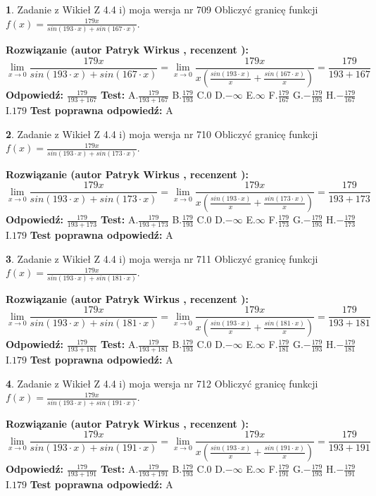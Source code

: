 \documentclass[12pt, a4paper]{article}
\theoremstyle{definition} %
\newtheorem{zad}{}
\newcommand{\zadStart}[1]{\begin{zad}#1\newline}
\newcommand{\zadStop}{\end{zad}}
\newcommand{\rozwStart}[2]{\noindent \textbf{Rozwiązanie (autor #1 , recenzent #2): }\newline}
\newcommand{\rozwStop}{\newline}
\newcommand{\odpStart}{\noindent \textbf{Odpowiedź:}\newline}
\newcommand{\odpStop}{\newline}
\newcommand{\testStart}{\noindent \textbf{Test:}\newline}
\newcommand{\testStop}{\newline}
\newcommand{\kluczStart}{\noindent \textbf{Test poprawna odpowiedź:}\newline}
\newcommand{\kluczStop}{\newline}
\begin{document}
\zadStart{Zadanie z Wikieł Z 4.4 i) moja wersja nr 709}
Obliczyć granicę funkcji $f(x)=\frac{179x}{sin(193\cdot x) +sin(167\cdot x)}$.
\zadStop
\rozwStart{Patryk Wirkus}{}
$$\lim\limits_{x\to 0}\frac{179x}{sin(193\cdot x) +sin(167\cdot x)}=\lim\limits_{x\to 0}\frac{179x}{x(\frac{sin(193\cdot x)}{x}+\frac{sin(167\cdot x)}{x})}=\frac{179}{193+167}$$
\rozwStop
\odpStart
$\frac{179}{193+167}$
\odpStop
\testStart
A.$\frac{179}{193+167}$
B.$\frac{179}{193}$
C.$0$
D.$-\infty$
E.$\infty$
F.$\frac{179}{167}$
G.$-\frac{179}{193}$
H.$-\frac{179}{167}$
I.$179$
\testStop
\kluczStart
A
\kluczStop



\zadStart{Zadanie z Wikieł Z 4.4 i) moja wersja nr 710}
Obliczyć granicę funkcji $f(x)=\frac{179x}{sin(193\cdot x) +sin(173\cdot x)}$.
\zadStop
\rozwStart{Patryk Wirkus}{}
$$\lim\limits_{x\to 0}\frac{179x}{sin(193\cdot x) +sin(173\cdot x)}=\lim\limits_{x\to 0}\frac{179x}{x(\frac{sin(193\cdot x)}{x}+\frac{sin(173\cdot x)}{x})}=\frac{179}{193+173}$$
\rozwStop
\odpStart
$\frac{179}{193+173}$
\odpStop
\testStart
A.$\frac{179}{193+173}$
B.$\frac{179}{193}$
C.$0$
D.$-\infty$
E.$\infty$
F.$\frac{179}{173}$
G.$-\frac{179}{193}$
H.$-\frac{179}{173}$
I.$179$
\testStop
\kluczStart
A
\kluczStop



\zadStart{Zadanie z Wikieł Z 4.4 i) moja wersja nr 711}
Obliczyć granicę funkcji $f(x)=\frac{179x}{sin(193\cdot x) +sin(181\cdot x)}$.
\zadStop
\rozwStart{Patryk Wirkus}{}
$$\lim\limits_{x\to 0}\frac{179x}{sin(193\cdot x) +sin(181\cdot x)}=\lim\limits_{x\to 0}\frac{179x}{x(\frac{sin(193\cdot x)}{x}+\frac{sin(181\cdot x)}{x})}=\frac{179}{193+181}$$
\rozwStop
\odpStart
$\frac{179}{193+181}$
\odpStop
\testStart
A.$\frac{179}{193+181}$
B.$\frac{179}{193}$
C.$0$
D.$-\infty$
E.$\infty$
F.$\frac{179}{181}$
G.$-\frac{179}{193}$
H.$-\frac{179}{181}$
I.$179$
\testStop
\kluczStart
A
\kluczStop



\zadStart{Zadanie z Wikieł Z 4.4 i) moja wersja nr 712}
Obliczyć granicę funkcji $f(x)=\frac{179x}{sin(193\cdot x) +sin(191\cdot x)}$.
\zadStop
\rozwStart{Patryk Wirkus}{}
$$\lim\limits_{x\to 0}\frac{179x}{sin(193\cdot x) +sin(191\cdot x)}=\lim\limits_{x\to 0}\frac{179x}{x(\frac{sin(193\cdot x)}{x}+\frac{sin(191\cdot x)}{x})}=\frac{179}{193+191}$$
\rozwStop
\odpStart
$\frac{179}{193+191}$
\odpStop
\testStart
A.$\frac{179}{193+191}$
B.$\frac{179}{193}$
C.$0$
D.$-\infty$
E.$\infty$
F.$\frac{179}{191}$
G.$-\frac{179}{193}$
H.$-\frac{179}{191}$
I.$179$
\testStop
\kluczStart
A
\kluczStop
\end{document}
